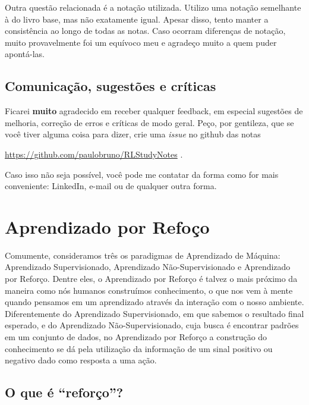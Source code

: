 \documentclass{article}
\begin{document}
            Outra questão relacionada é a notação utilizada. Utilizo uma notação semelhante à do livro base, mas não exatamente igual. Apesar disso, tento manter a consistência ao longo de todas as notas. Caso ocorram diferenças de notação, muito provavelmente foi um equívoco meu e agradeço muito a quem puder apontá-las.
            
        \subsection{Comunicação, sugestões e críticas}
            
            Ficarei \textbf{muito} agradecido em receber qualquer feedback, em especial sugestões de melhoria, correção de erros e críticas de modo geral. Peço, por gentileza, que se você tiver alguma coisa para dizer, crie uma \emph{issue} no github das notas
            
            \begin{center}
                \url{https://github.com/paulobruno/RLStudyNotes} .
            \end{center}
            Caso isso não seja possível, você pode me contatar da forma como for mais conveniente: LinkedIn, e-mail ou de qualquer outra forma.
            
            
    \section{Aprendizado por Refoço}
    
        Comumente, consideramos três os paradigmas de Aprendizado de Máquina: Aprendizado Supervisionado, Aprendizado Não-Supervisionado e Aprendizado por Reforço. Dentre eles, o Aprendizado por Reforço é talvez o mais próximo da maneira como nós humanos construímos conhecimento, o que nos vem à mente quando pensamos em um aprendizado através da interação com o nosso ambiente. Diferentemente do Aprendizado Supervisionado, em que sabemos o resultado final esperado, e do Aprendizado Não-Supervisionado, cuja busca é encontrar padrões em um conjunto de dados, no Aprendizado por Reforço a construção do conhecimento se dá pela utilização da informação de um sinal positivo ou negativo dado como resposta a uma ação. 
        
        \subsection{O que é ``reforço''?}
        
\end{document}

